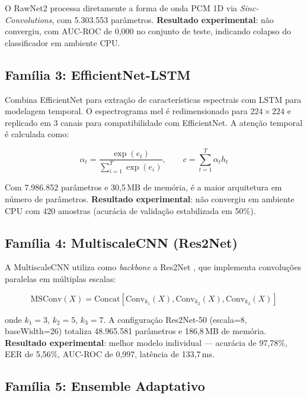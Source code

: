 \documentclass[12pt,a4paper]{article}
\begin{document}
O RawNet2 \cite{tak2021rawnet2} processa diretamente a forma de onda PCM 1D
via \textit{Sinc-Convolutions}, com 5.303.553 par\^{a}metros.
\textbf{Resultado experimental}: n\~{a}o convergiu, com AUC-ROC de 0,000 no
conjunto de teste, indicando colapso do classificador em ambiente CPU.

\subsection{Fam\'{i}lia 3: EfficientNet-LSTM}

Combina EfficientNet para extra\c{c}\~{a}o de caracter\'{i}sticas espectrais
com LSTM para modelagem temporal.
O espectrograma mel \'{e} redimensionado para $224\times224$ e replicado em 3
canais para compatibilidade com EfficientNet.
A aten\c{c}\~{a}o temporal \'{e} calculada como:

\begin{equation}
\alpha_t = \frac{\exp(e_t)}{\displaystyle\sum_{i=1}^{T}\exp(e_i)},
\qquad c = \sum_{t=1}^{T}\alpha_t h_t
\end{equation}

Com 7.986.852 par\^{a}metros e 30,5\,MB de mem\'{o}ria, \'{e} a maior
arquitetura em n\'{u}mero de par\^{a}metros.
\textbf{Resultado experimental}: n\~{a}o convergiu em ambiente CPU com
420 amostras (acur\'{a}cia de valida\c{c}\~{a}o estabilizada em 50\%).

\subsection{Fam\'{i}lia 4: MultiscaleCNN (Res2Net)}

A MultiscaleCNN utiliza como \textit{backbone} a Res2Net \cite{gao2021res2net},
que implementa convolu\c{c}\~{o}es paralelas em m\'{u}ltiplas escalas:

\begin{equation}
\text{MSConv}(X) =
\text{Concat}[\text{Conv}_{k_1}(X), \text{Conv}_{k_2}(X),
\text{Conv}_{k_3}(X)]
\end{equation}

onde $k_1=3$, $k_2=5$, $k_3=7$.
A configura\c{c}\~{a}o Res2Net-50 (escala=8, baseWidth=26) totaliza
48.965.581 par\^{a}metros e 186,8\,MB de mem\'{o}ria.
\textbf{Resultado experimental}: melhor modelo individual --- acur\'{a}cia de
97,78\%, EER de 5,56\%, AUC-ROC de 0,997, lat\^{e}ncia de 133,7\,ms.

\subsection{Fam\'{i}lia 5: Ensemble Adaptativo}
\end{document}
